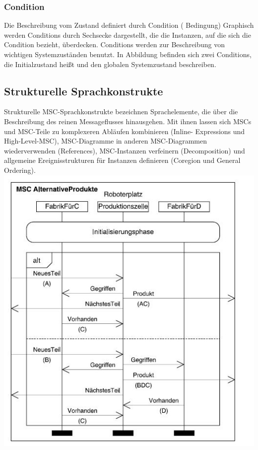 \subsubsection{Condition}
Die Beschreibung vom Zustand definiert durch Condition ( Bedingung)
Graphisch werden Conditions durch Sechsecke dargestellt,
die die Instanzen, auf die sich die Condition bezieht,
überdecken\cite{MT009}. Conditions werden zur Beschreibung von
wichtigen Systemzuständen benutzt. In Abbildung befinden sich
zwei Conditions, die Initialzustand heißt und den globalen Systemzustand beschreiben.


\subsection{Strukturelle Sprachkonstrukte}
Strukturelle MSC-Sprachkonstrukte bezeichnen Sprachelemente,
die über die Beschreibung des reinen Messageflusses
hinausgehen. Mit ihnen lassen sich MSCs und
MSC-Teile zu komplexeren Abläufen kombinieren (Inline-
Expressions und High-Level-MSC), MSC-Diagramme in
anderen MSC-Diagrammen wiederverwenden (References),
MSC-Instanzen verfeinern (Decomposition) und allgemeine
Ereignisstrukturen für Instanzen definieren (Coregion und
General Ordering)\cite{MT009}.\\



\includegraphics[scale=1]{Graphics/MSCmit.jpg}

